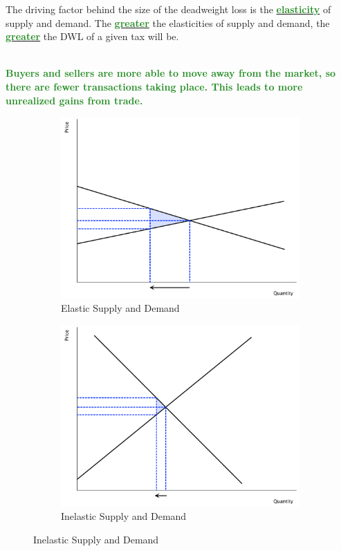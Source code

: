 \documentclass[11pt]{article}\usepackage[]{graphicx}\usepackage[]{color}
\theoremstyle{definition}
\newcommand{\ddp}[1]{{\textbf{\textcolor{ForestGreen}{#1}}}}
\newcommand{\dd}[1]{{\underline{\textbf{\textcolor{ForestGreen}{#1}}}}}
\begin{document}
	The driving factor behind the size of the deadweight loss is the \dd{elasticity} of supply and demand. The \dd{greater} the elasticities of supply and demand, the \dd{greater} the DWL of a given tax will be.
	
	\ddp{\\ Buyers and sellers are more able to move away from the market, so there are fewer transactions taking place. This leads to more unrealized gains from trade.}
	
		\begin{figure}[H]
			\centering
			\caption{Taxes, Elasticity, and DWL}
			\begin{subfigure}{.5\textwidth}
				\includegraphics[scale=.25]{plot45.pdf}
				\caption{Elastic Supply and Demand}
			\end{subfigure}%
			\begin{subfigure}{.5\textwidth}
				\centering
				\includegraphics[scale=.25]{plot46.pdf}
				\caption{Inelastic Supply and Demand}
			\end{subfigure}
		\end{figure}
		
\end{document}
